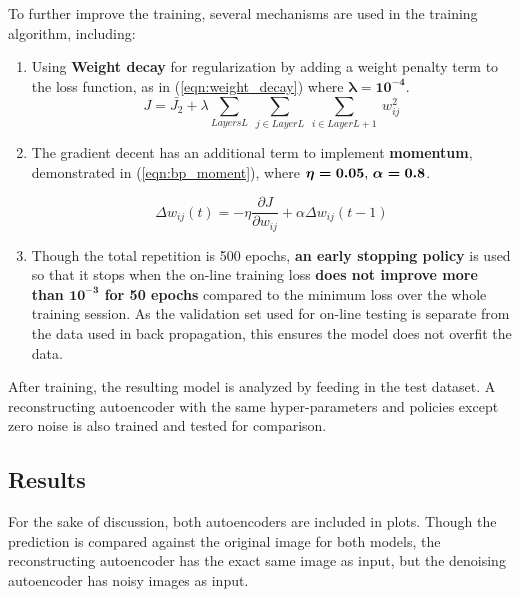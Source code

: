 \documentclass[11pt,titlepage]{article}
\begin{document}
To further improve the training, several mechanisms are used in the training algorithm, including:
\begin{enumerate}[label=\alph*.]
	\item Using \textbf{Weight decay} for regularization by adding a weight penalty term to the loss function, as in (\ref{eqn:weight_decay}) where $\boldsymbol{\lambda = 10^{-4}}$.
	\begin{equation}
		J = \bar{J_2} + \lambda \sum_{Layers L} \  \sum_{j \in Layer L} \  \sum_{i \in Layer L+1} \ w_{ij}^2
		\label{eqn:weight_decay}
	\end{equation}

	\item The gradient decent has an additional term to implement \textbf{momentum}, demonstrated in (\ref{eqn:bp_moment}), where \textbf{$\boldsymbol{\eta = 0.05$, $\alpha = 0.8}$}. 

	\begin{equation}
		\Delta w_{ij}(t) = -\eta \frac{\partial J}{\partial w_{ij}} + \alpha \Delta w_{ij} (t-1)
		\label{eqn:bp_moment}
	\end{equation}
	
	
	\item Though the total repetition is 500 epochs, \textbf{an early stopping policy} is used so that it stops when the on-line training loss \textbf{does not improve more than $\boldsymbol{10^{-3}}$ for 50 epochs} compared to the minimum loss over the whole training session. As the validation set used for on-line testing is separate from the data used in back propagation, this ensures the model does not overfit the data. 
\end{enumerate}

After training, the resulting model is analyzed by feeding in the test dataset. A reconstructing autoencoder with the same hyper-parameters and policies except zero noise is also trained and tested for comparison.












\subsection{Results}
For the sake of discussion, both autoencoders are included in plots. Though the prediction is compared against the original image for both models, the reconstructing autoencoder has the exact same image as input, but the denoising autoencoder has noisy images as input. 
\end{document}
